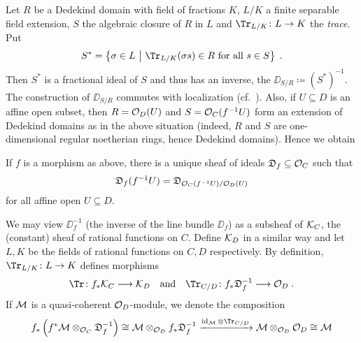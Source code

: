 \documentclass[a4paper,parskip=half,numbers=enddot, DIV=12]{scrreprt}
\begin{document}
Let $R$ be a Dedekind domain with field of fractions $K$, $L/K$ a finite separable field extension, $S$ the algebraic closure of $R$ in $L$ and $\Tr_{L/K}\colon L\morphism K$ the \emph{trace}. Put
\begin{align*}
	S^*=\left\{\sigma\in L\st \Tr_{L/K}(\sigma s)\in R\text{ for all }s\in S\right\}\;.
\end{align*}
Then $S^*$ is a fractional ideal of $S$ and thus has an inverse, the  $\DD_{S/R}\coloneqq (S^*)^{-1}$. The construction of $\DD_{S/R}$ commutes with localization (cf.\ \cite[Ch.\ III, (2.2)]{NEUKIRCH}). Also, if $U\subseteq D$ is an affine open subset, then $R=\mathcal{O}_D(U)$ and $S=\mathcal{O}_C(f^{-1}U)$ form an extension of Dedekind domains as in the above situation (indeed, $R$ and $S$ are one-dimensional regular noetherian rings, hence Dedekind domains). Hence we obtain
\begin{fact}
	If $f$ is a morphism as above, there is a unique sheaf of ideals $\mathfrak{D}_f\subseteq \mathcal{O}_C$ such that 
	\begin{align*}
		\mathfrak{D}_f(f^{-1}U)=\mathfrak{D}_{\mathcal{O}_C(f^{-1}U)/\mathcal{O}_D(U)}
	\end{align*}
	for all affine open $U\subseteq D$.
\end{fact}
We may view $\DD_f^{-1}$ (the inverse of the line bundle $\DD_f$) as a subsheaf of $\mathcal{K}_C$, the (constant) sheaf of rational functions on $C$. Define $\mathcal{K}_D$ in a similar way and let $L,K$ be the fields of rational functions on $C,D$ respectively. By definition, $\Tr_{L/K}\colon L\morphism K$ defines morphisms
\begin{align*}
	\Tr\colon f_*\Kk_C\morphism\Kk_D\quad\text{and}\quad\Tr_{C/D}\colon f_*\DD_f^{-1}\morphism \Oo_D\;.
\end{align*}
If $\mathcal{M}$ is a quasi-coherent $\mathcal{O}_D$-module, we denote the composition
\begin{align*}
	f_*\left(f^*\Mm\otimes_{\Oo_C}\DD_f^{-1}\right)\cong \Mm\otimes_{\Oo_D}f_*\DD_f^{-1}\xrightarrow{\id_\Mm\otimes \Tr_{C/D}}\Mm\otimes_{\Oo_D}\Oo_D\cong \Mm
\end{align*}
\end{document}
